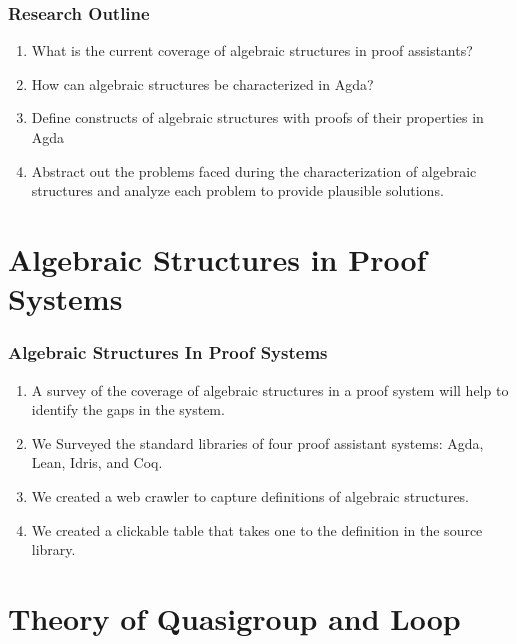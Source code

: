 \documentclass[xcolor={dvipsnames}]{beamer}
\begin{document}
\begin{frame}

  \frametitle{Research Outline}

  \begin{enumerate}
    \item What is the current coverage of algebraic structures in proof assistants?
    \item How can algebraic structures be characterized in Agda? 
    \item Define constructs of algebraic structures with proofs of their properties in Agda
    \item Abstract out the problems faced during the characterization of
    algebraic structures and analyze each problem to provide plausible
    solutions.    
  \end{enumerate}

\end{frame}

\section{Algebraic Structures in Proof Systems}

\begin{frame}
  \frametitle{Algebraic Structures In Proof Systems}
  \begin{enumerate}
    \item A survey of the coverage of algebraic structures in a proof system will
    help to identify the gaps in the system.
    \item We Surveyed the standard libraries of four proof assistant systems: Agda, Lean, Idris, and Coq.
    \item We created a web crawler to capture definitions of algebraic structures.
    \item We created a clickable table that takes one to the definition in the source library.
  \end{enumerate}

\end{frame}

\section{Theory of Quasigroup and Loop}
\end{document}
